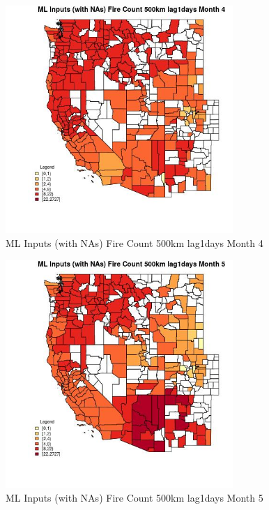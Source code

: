 \begin{figure} 
\centering  
\includegraphics[width=0.77\textwidth]{Code_Outputs/Report_ML_input_PM25_Step4_part_f_de_duplicated_aveswNAs_CountyFire_Count_500km_lag1daysmedianMonth4.jpg} 
\caption{\label{fig:Report_ML_input_PM25_Step4_part_f_de_duplicated_aveswNAsCountyFire_Count_500km_lag1daysmedianMonth4}ML Inputs (with NAs) Fire Count 500km lag1days Month 4} 
\end{figure} 
 

\begin{figure} 
\centering  
\includegraphics[width=0.77\textwidth]{Code_Outputs/Report_ML_input_PM25_Step4_part_f_de_duplicated_aveswNAs_CountyFire_Count_500km_lag1daysmedianMonth5.jpg} 
\caption{\label{fig:Report_ML_input_PM25_Step4_part_f_de_duplicated_aveswNAsCountyFire_Count_500km_lag1daysmedianMonth5}ML Inputs (with NAs) Fire Count 500km lag1days Month 5} 
\end{figure} 
 

